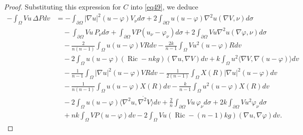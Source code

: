 \documentclass[reqno,11pt]{amsart}
\numberwithin{equation}{section}  %
\begin{document}
\begin{proof}
Substituting this expression for \(C\) into \eqref{eq49}, we deduce
\begin{align}\label{eq411}
-\int_{\Omega}Vu\,\Delta P dv
&=
-\int_{\partial\Omega}|\nabla u|^{2}(u-\varphi)V_{\nu} d\sigma
+2\int_{\partial\Omega}u(u-\varphi)\nabla^{2}u(\nabla V,\nu)d\sigma
\nonumber\\
&\quad
-\int_{\partial\Omega}Vu\,P_{\nu}d\sigma
+\int_{\partial\Omega}VP(u_{\nu}-\varphi_{\nu})d\sigma
+2\int_{\partial\Omega}Vu\nabla^{2}u(\nabla\varphi,\nu)d\sigma
\nonumber\\
&\quad
-\frac{2}{n(n-1)}
\int_{\Omega}u(u-\varphi)VR dv
-\frac{2k}{n-1}
\int_{\Omega}Vu^{2}(u-\varphi)R dv
\nonumber\\
&\quad
-2\int_{\Omega}u(u-\varphi)(\operatorname{Ric}-nkg)(\nabla u,\nabla V)dv
+k\int_{\Omega}u^{2}\langle\nabla V,\nabla(u-\varphi)\rangle dv
\nonumber\\
&\quad
-\frac{1}{n-1}
\int_{\Omega}|\nabla u|^{2}(u-\varphi)VR dv
-\frac{1}{2(n-1)}
\int_{\Omega}X(R)|\nabla u|^{2}(u-\varphi)dv
\nonumber\\
&\quad
-\frac{1}{n(n-1)}
\int_{\Omega}u(u-\varphi)X(R)dv
-\frac{k}{n-1}
\int_{\Omega}u^{2}(u-\varphi)X(R) dv
\nonumber\\
&\quad
-2\int_{\Omega}u(u-\varphi)
\langle\nabla^{2}u,\mathring{\nabla^{2}V}\rangle dv
+\frac{2}{n}\int_{\partial\Omega}Vu\,\varphi_{\nu}d\sigma
+2k\int_{\partial\Omega}Vu^{2}\varphi_{\nu}d\sigma
\nonumber\\
&\quad
+nk\int_{\Omega}VP(u-\varphi)dv
-2\int_{\Omega}Vu(\operatorname{Ric}-(n-1)kg)(\nabla u,\nabla\varphi)dv.
\end{align}


\end{proof}
\end{document}
